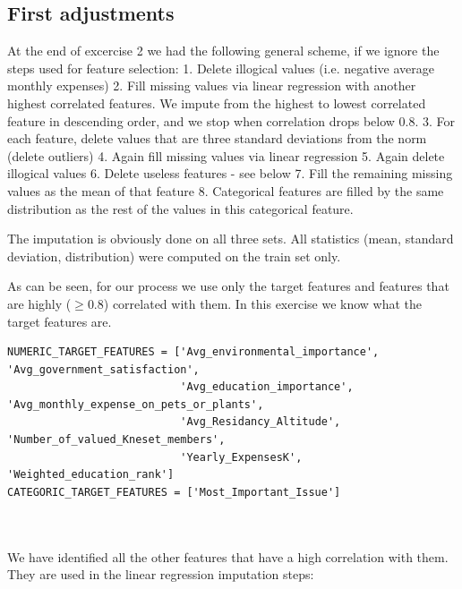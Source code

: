 \documentclass[12pt]{article}
\begin{document}
\subsection{First adjustments}
At the end of excercise 2 we had the following general scheme, if we ignore the steps used for feature selection:
1. Delete illogical values (i.e. negative average monthly expenses)
2. Fill missing values via linear regression with another highest correlated features. We impute from the highest to lowest correlated feature in descending order, and we stop when correlation drops below 0.8.
3. For each feature, delete values that are three standard deviations from the norm (delete outliers)
4. Again fill missing values via linear regression
5. Again delete illogical values
6. Delete useless features - see below
7. Fill the remaining missing values as the mean of that feature
8. Categorical features are filled by the same distribution as the rest of the values in this categorical feature.

The imputation is obviously done on all three sets. All statistics (mean, standard deviation, distribution) were computed on the train set only.

As can be seen, for our process we use only the target features
and features that are highly ($\geq 0.8$) correlated with them. In this exercise we know what the target features are.\\

\begin{adjustbox}{max width=\linewidth}
\begin{lstlisting}
NUMERIC_TARGET_FEATURES = ['Avg_environmental_importance', 'Avg_government_satisfaction',
                           'Avg_education_importance', 'Avg_monthly_expense_on_pets_or_plants',
                           'Avg_Residancy_Altitude', 'Number_of_valued_Kneset_members',
                           'Yearly_ExpensesK', 'Weighted_education_rank']
CATEGORIC_TARGET_FEATURES = ['Most_Important_Issue']
\end{lstlisting}
\end{adjustbox}\\\\


We have identified all the other features that have a high correlation with them. They are used in the linear regression imputation steps:\\
\end{document}
